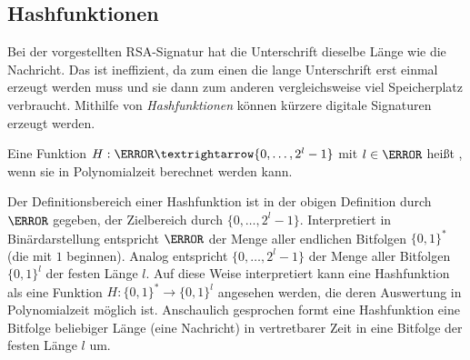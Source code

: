 \subsection{Hashfunktionen}

Bei der vorgestellten RSA-Signatur hat die Unterschrift dieselbe Länge wie die Nachricht. Das ist ineffizient, da zum einen die lange Unterschrift erst einmal erzeugt werden muss und sie dann zum anderen vergleichsweise viel Speicherplatz verbraucht. Mithilfe von \emph{Hashfunktionen} können kürzere digitale Signaturen erzeugt werden. 

\begin{definition}[Hashfunktion]
 Eine Funktion $H: \N → \{0, \dots, 2^l-1\}$ mit $l \in \N$ heißt , wenn sie in Polynomialzeit berechnet werden kann. 
\end{definition}

\begin{remark}
 Der Definitionsbereich einer Hashfunktion ist in der obigen Definition durch $\N$ gegeben, der Zielbereich durch $\{0, \dotsc, 2^l-1\}$. Interpretiert in Binärdarstellung entspricht $\N$ der Menge aller endlichen Bitfolgen $\{0, 1\}^*$ (die mit $1$ beginnen). Analog entspricht $\{0, \dots, 2^l-1\}$ der Menge aller Bitfolgen $\{0, 1\}^l$ der festen Länge $l$. Auf diese Weise interpretiert kann eine Hashfunktion als eine Funktion $H: \{0, 1\}^* → \{0, 1\}^l$ angesehen werden, die deren Auswertung in Polynomialzeit möglich ist. Anschaulich gesprochen formt eine Hashfunktion eine Bitfolge beliebiger Länge (\zB eine Nachricht) in vertretbarer Zeit in eine Bitfolge der festen Länge $l$ um.
\end{remark}

